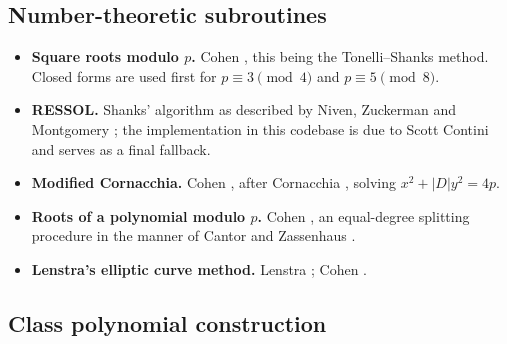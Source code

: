 \documentclass[11pt,a4paper]{article}
\begin{document}
\subsection{Number-theoretic subroutines}

\begin{itemize}
  \item \textbf{Square roots modulo $p$.} Cohen
    \cite[Algorithm 1.5.1, p.~33]{cohen1993}, this being the
    Tonelli--Shanks method. Closed forms are used first for
    $p \equiv 3 \pmod 4$ and $p \equiv 5 \pmod 8$.
  \item \textbf{RESSOL.} Shanks' algorithm as described by Niven,
    Zuckerman and Montgomery \cite[pp.~110--114]{niven1991}; the
    implementation in this codebase is due to Scott Contini and serves as
    a final fallback.
  \item \textbf{Modified Cornacchia.} Cohen
    \cite[Algorithm 1.5.3, p.~36]{cohen1993}, after Cornacchia
    \cite{cornacchia1908}, solving $x^2 + |D|y^2 = 4p$.
  \item \textbf{Roots of a polynomial modulo $p$.} Cohen
    \cite[Algorithm 1.6.1, p.~37]{cohen1993}, an equal-degree splitting
    procedure in the manner of Cantor and Zassenhaus
    \cite{cantor1981}.
  \item \textbf{Lenstra's elliptic curve method.} Lenstra
    \cite{lenstra1987}; Cohen \cite[Algorithm 10.3.3, p.~488]{cohen1993}.
\end{itemize}

\subsection{Class polynomial construction}
\end{document}
